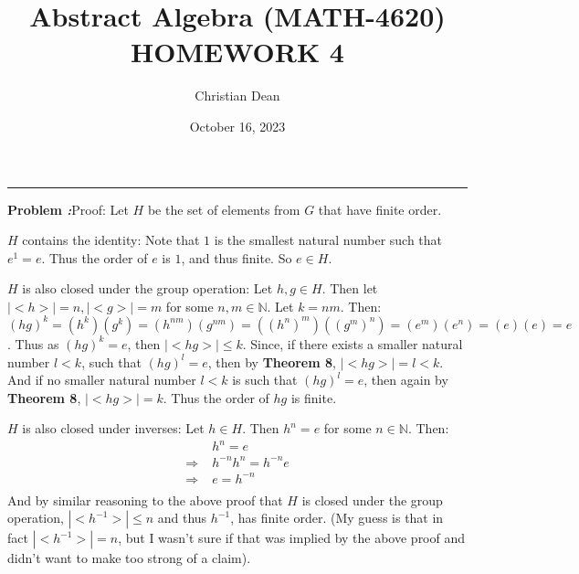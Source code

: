 \documentclass[12pt, letterpaper]{article}
\title{Abstract Algebra (MATH-4620) HOMEWORK 4}
\author{Christian Dean}
\date{October 16, 2023}
\newenvironment{problem}
    [1]
    {\noindent \textbf{Problem #1:}}
    {\vspace{3mm}}
\begin{document}
\maketitle

\noindent\hfil\rule{16cm}{0.4pt}\hfil

\begin{problem}{1}
    \emph{Proof:} Let $H$ be the set of elements from $G$ that have finite order.

    \bigskip\noindent
    $H$ contains the identity: Note that $1$ is the smallest natural number such that 
    $e^1 = e$. Thus the order of $e$ is $1$, and thus finite. So $e \in H$.

    \bigskip\noindent
    $H$ is also closed under the group operation: Let $h, g \in H$. Then let $|{<}h{>}| = n,
    |{<}g{>}| = m$ for some $n, m \in \mathbb{N}$. Let $k = nm$. Then: $(hg)^k = (h^k)(g^k) = 
    (h^{nm})(g^{nm}) = ((h^n)^m)((g^m)^n) = (e^m)(e^n) = (e)(e) = e$. Thus as $(hg)^k = e$, then
    $|{<}hg{>}| \le k$. Since, if there exists a smaller natural number $l < k$, such
    that $(hg)^l = e$, then by \textbf{Theorem 8}, $|{<}hg{>}| = l < k$. And if no smaller 
    natural number $l < k$ is such that $(hg)^l = e$, then again by \textbf{Theorem 8}, 
    $|{<}hg{>}| = k$. Thus the order of $hg$ is finite.

    \bigskip\noindent
    $H$ is also closed under inverses: Let $h \in H$. Then $h^n = e$ for some $n \in \mathbb{N}$.
    Then:
        \begin{align*}
            &h^n = e\\
            \Rightarrow \; &h^{-n}h^n = h^{-n}e\\
            \Rightarrow \; &e = h^{-n}\\
        \end{align*}
    And by similar reasoning to the above proof that $H$ is closed under the group operation,
    $|{<}h^{-1}{>}| \leq n$ and thus $h^{-1}$, has finite order. (My guess is that in fact 
    $|{<}h^{-1}{>}| = n$, but I wasn't sure if that was implied by the above proof and didn't
    want to make too strong of a claim).
\end{problem}
\end{document}
